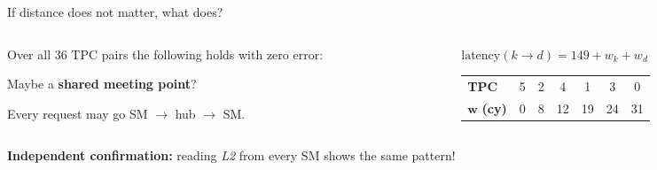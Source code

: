\documentclass[aspectratio=169, numbering=fraction]{beamer}
\begin{document}
\begin{frame}{If distance does not matter, what does?}
  \vspace{0.2em}
  \footnotesize
  \begin{columns}[c,onlytextwidth]
  \begin{column}{0.58\textwidth}
    Over all 36 TPC pairs the following holds with zero error:

    \vspace{0.6em}
    Maybe a \textbf{shared meeting point}?

    \vspace{0.6em}
    Every request may go SM $\to$ hub $\to$ SM.
  \end{column}
  \begin{column}{0.4\textwidth}
    \centering
    $\text{latency}(k \to d) = 149 + w_k + w_d$

    \vspace{0.5em}
    \scriptsize
    \begin{tabular}{lcccccc}
      \toprule
      \textbf{TPC} & 5 & 2 & 4 & 1 & 3 & 0 \\
      $\boldsymbol{w}$ \textbf{(cy)} & 0 & 8 & 12 & 19 & 24 & 31 \\
      \bottomrule
    \end{tabular}
  \end{column}
  \end{columns}

  \vspace{2em}
  \textbf{Independent confirmation:} reading \emph{L2} from every SM shows the same pattern!
  \vspace{1em}


\end{frame}
\end{document}
